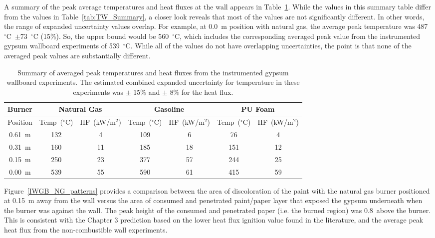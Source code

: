 \documentclass[twoside]{uocthesis}
\begin{document}
{A summary of the peak average temperatures and heat fluxes at the wall appears in Table~\ref{tab:IWGB_Summary}. While the values in this summary table differ from the values in Table~\ref{tab:TW_Summary}, a closer look reveals that most of the values are not significantly different.  In other words, the range of expanded uncertainty values overlap.  For example, at 0.0~m position with natural gas, the average peak temperature was 487~$^\circ$C~$\pm$73~$^\circ$C (15\%). So, the upper bound would be 560~$^\circ$C, which includes the corresponding averaged peak value from the instrumented gypsum wallboard experiments of 539~$^\circ$C.  While all of the values do not have overlapping uncertainties, the point is that none of the averaged peak values are substantially different.        

\begin{table}
	\centering
	\scriptsize
	\begin{tabular}{|c|c|c|c|c|c|c|}
		\hline {Burner} & \multicolumn{2}{c}{Natural Gas} & \multicolumn{2}{c}{Gasoline} & \multicolumn{2}{c|}{PU Foam} \\
		\hline  Position & Temp~($^\circ$C) & HF~(kW/m$^{2}$) & Temp~($^\circ$C) & HF~(kW/m$^{2}$) & Temp~($^\circ$C) & HF~(kW/m$^{2}$) 	\\
		\hline \hline 0.61~m & 132 & 4 & 109 & 6 & 76 & 4 \\
		\hline 0.31~m & 160 & 11 & 185 & 18 & 151 & 12	\\
		\hline 0.15~m & 250 & 23 & 377 & 57 & 244 & 25	\\
		\hline 0.00~m & 539 & 55 & 590 & 61 & 415 & 59 	\\
		\hline
	\end{tabular}
	\caption[Summary of instrumented gypsum wallboard experiments]{Summary of averaged peak temperatures and heat fluxes from the instrumented gypsum wallboard experiments.  The estimated combined expanded uncertainty for temperature in these experiments was $\pm$ 15\% and $\pm$ 8\% for the heat flux.} 
	\label{tab:IWGB_Summary}
\end{table}

Figure~\ref{IWGB_NG_patterns} provides a comparison between the area of discoloration of the paint with the natural gas burner positioned at 0.15~m away from the wall versus the area of consumed and penetrated paint/paper layer that exposed the gypsum underneath when the burner was against the wall. The peak height of the consumed and penetrated paper (i.e. the burned region) was 0.8~above the burner.  This is consistent with the Chapter 3 prediction based on the lower heat flux ignition value found in the literature, and the average peak heat flux from the non-combustible wall experiments. 

}
\end{document}
